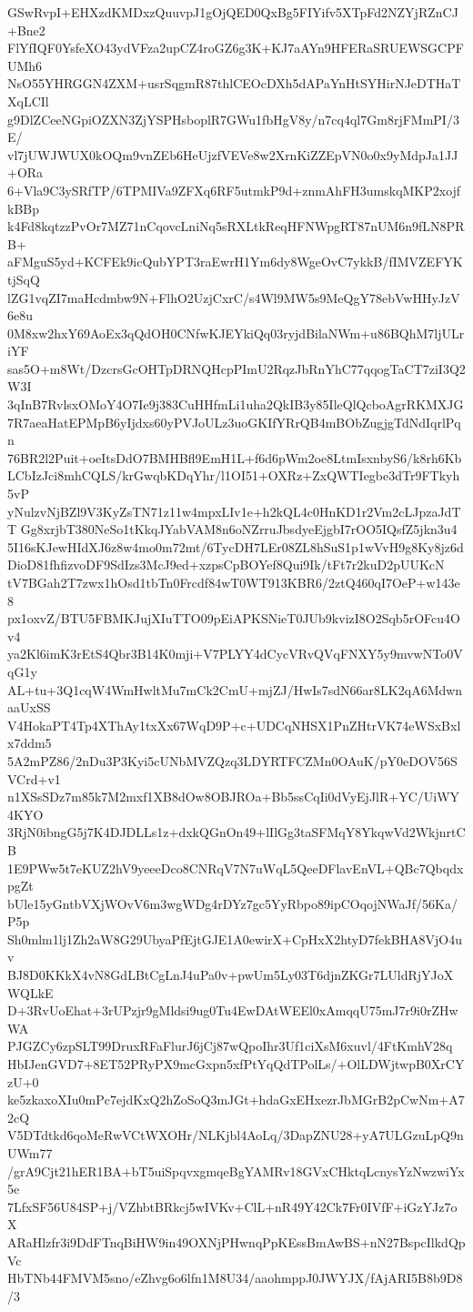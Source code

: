 GSwRvpI+EHXzdKMDxzQuuvpJ1gOjQED0QxBg5FIYifv5XTpFd2NZYjRZnCJ+Bne2
FlYfIQF0YsfeXO43ydVFza2upCZ4roGZ6g3K+KJ7aAYn9HFERaSRUEWSGCPFUMh6
NsO55YHRGGN4ZXM+usrSqgmR87thlCEOcDXh5dAPaYnHtSYHirNJeDTHaTXqLCIl
g9DlZCeeNGpiOZXN3ZjYSPHsboplR7GWu1fbHgV8y/n7cq4ql7Gm8rjFMmPI/3E/
vl7jUWJWUX0kOQm9vnZEb6HeUjzfVEVe8w2XrnKiZZEpVN0o0x9yMdpJa1JJ+ORa
6+Vla9C3ySRfTP/6TPMIVa9ZFXq6RF5utmkP9d+znmAhFH3umskqMKP2xojfkBBp
k4Fd8kqtzzPvOr7MZ71nCqovcLniNq5sRXLtkReqHFNWpgRT87nUM6n9fLN8PRB+
aFMguS5yd+KCFEk9icQubYPT3raEwrH1Ym6dy8WgeOvC7ykkB/fIMVZEFYKtjSqQ
lZG1vqZI7maHcdmbw9N+FlhO2UzjCxrC/s4Wl9MW5s9MeQgY78ebVwHHyJzV6e8u
0M8xw2hxY69AoEx3qQdOH0CNfwKJEYkiQq03ryjdBilaNWm+u86BQhM7ljULriYF
sas5O+m8Wt/DzcrsGcOHTpDRNQHcpPImU2RqzJbRnYhC77qqogTaCT7ziI3Q2W3I
3qInB7RvlsxOMoY4O7Ie9j383CuHHfmLi1uha2QkIB3y85IleQlQcboAgrRKMXJG
7R7aeaHatEPMpB6yIjdxs60yPVJoULz3uoGKIfYRrQB4mBObZugjgTdNdIqrlPqn
76BR2l2Puit+oeItsDdO7BMHBfl9EmH1L+f6d6pWm2oe8LtmIsxnbyS6/k8rh6Kb
LCbIzJci8mhCQLS/krGwqbKDqYhr/l1OI51+OXRz+ZxQWTIegbe3dTr9FTkyh5vP
yNulzvNjBZl9V3KyZsTN71z11w4mpxLIv1e+h2kQL4c0HnKD1r2Vm2cLJpzaJdTT
Gg8xrjbT380NeSo1tKkqJYabVAM8n6oNZrruJbsdyeEjgbI7rOO5IQsfZ5jkn3u4
5I16sKJewHIdXJ6z8w4mo0m72mt/6TycDH7LEr08ZL8hSuS1p1wVvH9g8Ky8jz6d
DioD81fhfizvoDF9SdIzs3McJ9ed+xzpsCpBOYef8Qui9Ik/tFt7r2kuD2pUUKcN
tV7BGah2T7zwx1hOsd1tbTn0Frcdf84wT0WT913KBR6/2ztQ460qI7OeP+w143e8
px1oxvZ/BTU5FBMKJujXIuTTO09pEiAPKSNieT0JUb9kvizI8O2Sqb5rOFcu4Ov4
ya2Kl6imK3rEtS4Qbr3B14K0mji+V7PLYY4dCycVRvQVqFNXY5y9mvwNTo0VqG1y
AL+tu+3Q1cqW4WmHwltMu7mCk2CmU+mjZJ/HwIs7sdN66ar8LK2qA6MdwnaaUxSS
V4HokaPT4Tp4XThAy1txXx67WqD9P+c+UDCqNHSX1PnZHtrVK74eWSxBxlx7ddm5
5A2mPZ86/2nDu3P3Kyi5cUNbMVZQzq3LDYRTFCZMn0OAuK/pY0eDOV56SVCrd+v1
n1XSsSDz7m85k7M2mxf1XB8dOw8OBJROa+Bb5ssCqIi0dVyEjJlR+YC/UiWY4KYO
3RjN0ibngG5j7K4DJDLLs1z+dxkQGnOn49+lIlGg3taSFMqY8YkqwVd2WkjnrtCB
1E9PWw5t7eKUZ2hV9yeeeDco8CNRqV7N7uWqL5QeeDFlavEnVL+QBc7QbqdxpgZt
bUle15yGntbVXjWOvV6m3wgWDg4rDYz7gc5YyRbpo89ipCOqojNWaJf/56Ka/P5p
Sh0mlm1lj1Zh2aW8G29UbyaPfEjtGJE1A0ewirX+CpHxX2htyD7fekBHA8VjO4uv
BJ8D0KKkX4vN8GdLBtCgLnJ4uPa0v+pwUm5Ly03T6djnZKGr7LUldRjYJoXWQLkE
D+3RvUoEhat+3rUPzjr9gMldsi9ug0Tu4EwDAtWEEl0xAmqqU75mJ7r9i0rZHwWA
PJGZCy6zpSLT99DruxRFaFlurJ6jCj87wQpoIhr3Uf1ciXsM6xuvl/4FtKmhV28q
HbIJenGVD7+8ET52PRyPX9mcGxpn5xfPtYqQdTPolLs/+OlLDWjtwpB0XrCYzU+0
ke5zkaxoXIu0mPc7ejdKxQ2hZoSoQ3mJGt+hdaGxEHxezrJbMGrB2pCwNm+A72cQ
V5DTdtkd6qoMeRwVCtWXOHr/NLKjbl4AoLq/3DapZNU28+yA7ULGzuLpQ9nUWm77
/grA9Cjt21hER1BA+bT5uiSpqvxgmqeBgYAMRv18GVxCHktqLcnysYzNwzwiYx5e
7LfxSF56U84SP+j/VZhbtBRkcj5wIVKv+ClL+nR49Y42Ck7Fr0IVfF+iGzYJz7oX
ARaHlzfr3i9DdFTnqBiHW9in49OXNjPHwnqPpKEssBmAwBS+nN27BspcIlkdQpVc
HbTNb44FMVM5sno/eZhvg6o6lfn1M8U34/aaohmppJ0JWYJX/fAjARI5B8b9D8/3
